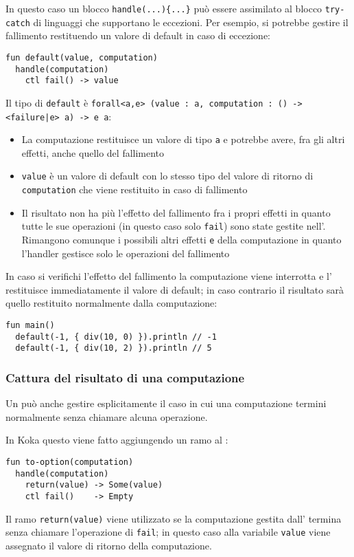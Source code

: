 In questo caso un blocco \lstinline|handle(...){...}| può essere assimilato al blocco \lstinline{try-catch} di linguaggi che supportano le eccezioni.
Per esempio, si potrebbe gestire il fallimento restituendo un valore di default in caso di eccezione:
\begin{lstlisting}[language=koka]
fun default(value, computation)
  handle(computation)
    ctl fail() -> value
\end{lstlisting}
Il tipo di \lstinline{default} è \lstinline{forall<a,e> (value : a, computation : () -> <failure|e> a) -> e a}:
\begin{itemize}
  \item La computazione restituisce un valore di tipo \lstinline{a} e potrebbe avere, fra gli altri effetti, anche quello del fallimento
  \item \lstinline{value} è un valore di default con lo stesso tipo del valore di ritorno di \lstinline{computation} che viene restituito in caso di fallimento
  \item Il risultato non ha più l'effetto del fallimento fra i propri effetti in quanto tutte le sue operazioni (in questo caso solo \lstinline{fail}) sono state gestite nell'. Rimangono comunque i possibili altri effetti \lstinline{e} della computazione in quanto l'handler gestisce solo le operazioni del fallimento
\end{itemize}

In caso si verifichi l'effetto del fallimento la computazione viene interrotta e l' restituisce immediatamente il valore di default; in caso contrario il risultato sarà quello restituito normalmente dalla computazione:
\begin{lstlisting}[language=koka]
fun main()
  default(-1, { div(10, 0) }).println // -1
  default(-1, { div(10, 2) }).println // 5
\end{lstlisting}

\subsubsection{Cattura del risultato di una computazione}
Un  può anche gestire esplicitamente il caso in cui una computazione termini normalmente senza chiamare alcuna operazione.

In Koka questo viene fatto aggiungendo un ramo al :
\begin{lstlisting}[language=koka]
fun to-option(computation)
  handle(computation)
    return(value) -> Some(value)
    ctl fail()    -> Empty
\end{lstlisting}
Il ramo \lstinline{return(value)} viene utilizzato se la computazione gestita dall' termina senza chiamare l'operazione di \lstinline{fail}; in questo caso alla variabile \lstinline{value} viene assegnato il valore di ritorno della computazione.

